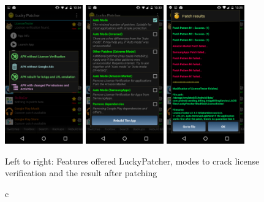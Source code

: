 \begin{figure}[h]
    \centering
    \includegraphics[width=0.3\textwidth]{data/luckyFeatures.png}
    \includegraphics[width=0.3\textwidth]{data/luckyModi.png}
    \includegraphics[width=0.3\textwidth]{data/luckyPatching.png}
    \caption{c}{Left to right: Features offered LuckyPatcher, modes to crack license verification and the result after patching}
    \label{fig:luckyScreen}
\end{figure}

